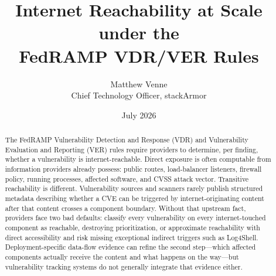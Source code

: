 \documentclass[11pt]{article}
\title{\bfseries Internet Reachability at Scale under the\\
FedRAMP VDR/VER Rules}
\author{Matthew Venne \\ \small Chief Technology Officer, stackArmor}
\date{July 2026}
\begin{document}
\maketitle

\begin{abstract}
\noindent
The FedRAMP Vulnerability Detection and Response (VDR) and Vulnerability
Evaluation and Reporting (VER) rules require providers to determine, per
finding, whether a vulnerability is internet-reachable. Direct exposure is
often computable from information providers already possess: public routes,
load-balancer listeners, firewall policy, running processes, affected
software, and CVSS attack vector. Transitive reachability is different.
Vulnerability sources and scanners rarely publish structured metadata
describing whether a CVE can be triggered by internet-originating content after
that content crosses a component boundary. Without that upstream fact,
providers face two bad defaults: classify every vulnerability on every
internet-touched component as reachable, destroying prioritization, or
approximate reachability with direct accessibility and risk missing exceptional
indirect triggers such as Log4Shell. Deployment-specific data-flow evidence can
refine the second step---which affected components actually receive the content
and what happens on the way---but vulnerability tracking systems do not
generally integrate that evidence either.


\end{abstract}
\end{document}
